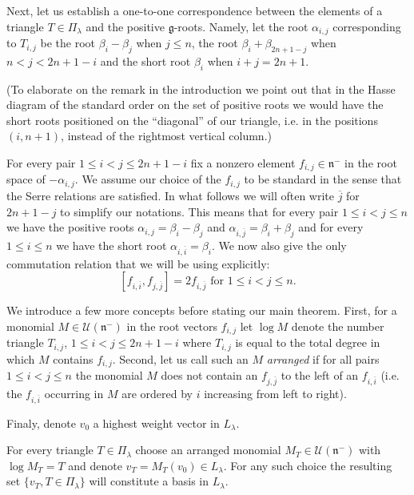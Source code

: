 \documentclass[ALCO,ThmDefs,Unicode]{cedram}
\newcommand{\la}{\lambda}
\begin{document}
Next, let us establish a one-to-one correspondence between the elements of a triangle $T\in\Pi_\la$ and the positive $\mathfrak g$-roots. Namely, let the root $\alpha_{i,j}$ corresponding to $T_{i,j}$ be the root $\beta_i-\beta_j$ when $j\le n$, the root $\beta_i+\beta_{2n+1-j}$ when $n<j<2n+1-i$ and the short root $\beta_i$ when $i+j=2n+1$.

(To elaborate on the remark in the introduction we point out that in the Hasse diagram of the standard order on the set of positive roots we would have the short roots positioned on the ``diagonal'' of our triangle, i.e. in the positions $(i,n+1)$, instead of the rightmost vertical column.)

For every pair $1\le i<j\le 2n+1-i$ fix a nonzero element $f_{i,j}\in\mathfrak n^-$ in the root space of $-\alpha_{i,j}$. We assume our choice of the $f_{i,j}$ to be standard in the sense that the Serre relations are satisfied. In what follows we will often write $\overline j$ for $2n+1-j$ to simplify our notations. This means that for every pair $1\le i<j\le n$ we have the positive roots $\alpha_{i,j}=\beta_i-\beta_j$ and $\alpha_{i,\overline j}=\beta_i+\beta_j$ and for every $1\le i\le n$ we have the short root $\alpha_{i,\overline i}=\beta_i$. We now also give the only commutation relation that we will be using explicitly:
\begin{equation}\label{comrel}
[f_{i,\overline i},f_{j,\overline j}]=2f_{i,\overline j}\text{ for }1\le i<j\le n.
\end{equation}

We introduce a few more concepts before stating our main theorem. First, for a monomial $M\in\mathcal U(\mathfrak n^-)$ in the root vectors $f_{i,j}$ let $\log M$ denote the number triangle $T_{i,j}$, $1\le i<j\le 2n+1-i$ where $T_{i,j}$ is equal to the total degree in which $M$ contains $f_{i,j}$. Second, let us call such an $M$ \emph{arranged} if for all pairs $1\le i<j\le n$ the monomial $M$ does not contain an $f_{j,\overline j}$ to the left of an $f_{i,\overline i}$ (i.e. the $f_{i,\overline i}$ occurring in $M$ are ordered by $i$ increasing from left to right).

Finaly, denote $v_0$ a highest weight vector in $L_\la$.

\begin{theo}\label{main}
For every triangle $T\in \Pi_\la$ choose an arranged monomial $M_T\in\mathcal U(\mathfrak n^-)$ with $\log M_T=T$ and denote $v_T=M_T (v_0)\in L_\la$. For any such choice the resulting set $\{v_T, T\in\Pi_\la\}$ will constitute a basis in $L_\la$.
\end{theo}
\end{document}
